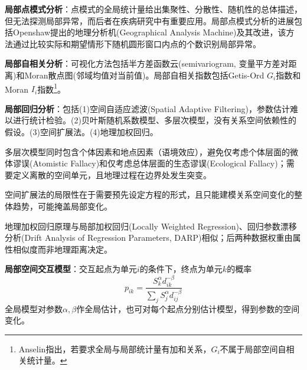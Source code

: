 \par \textbf{局部点模式分析}：点模式的全局统计量给出集聚性、分散性、随机性的总体描述，但无法探测局部异常，而后者在疾病研究中有重要应用。局部点模式分析的进展包括Openshaw提出的地理分析机(Geographical Analysis Machine)及其改进，该方法通过比较实际和期望情形下随机圆形窗口内点的个数识别局部异常。

\par \textbf{局部自相关分析}：可视化方法包括半方差函数云(semivariogram, 变量平方差对距离)和Moran散点图(邻域均值对当前值)。局部自相关指数包括Getis-Ord $G_i$指数和Moran $I_i$指数\footnote{Anselin指出，若要求全局与局部统计量有加和关系，$G_i$不属于局部空间自相关统计量。}。

\par \textbf{局部回归分析}：包括(1)空间自适应滤波(Spatial Adaptive Filtering)，参数估计难以进行统计检验。(2)贝叶斯随机系数模型、多层次模型，没有关系空间依赖性的假设。(3)空间扩展法。(4)地理加权回归。

\par 多层次模型同时包含个体因素和地点因素（语境效应），避免仅考虑个体层面的微体谬误(Atomistic Fallacy)和仅考虑总体层面的生态谬误(Ecological Fallacy)；需要定义离散的空间单元，且地理过程在边界处发生突变。

\par 空间扩展法的局限性在于需要预先设定方程的形式，且只能建模关系空间变化的整体趋势，可能掩盖局部变化。

\par 地理加权回归原理与局部加权回归(Locally Weighted Regression)、回归参数漂移分析(Drift Analysis of Regression Parameters, DARP)相似；后两种数据权重由属性相似度而非地理距离决定。

\par \textbf{局部空间交互模型}：交互起点为单元$i$的条件下，终点为单元$k$的概率
\begin{equation}
    p_{ik}=\frac{S_k^\alpha d_{ik}^{-\beta}}{\sum_j S_j^\alpha d_{ij}^{-\beta}}
\end{equation}
全局模型对参数$\alpha,\beta$作全局估计，也可对每个起点分别估计模型，得到参数的空间变化。
